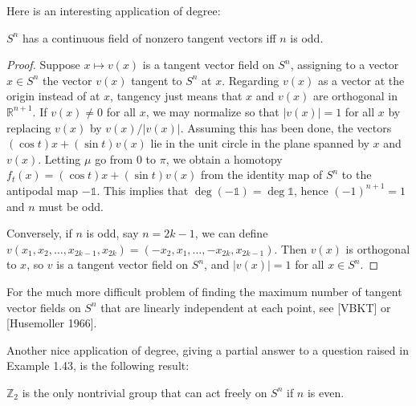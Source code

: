 Here is an interesting application of degree:

\begin{theorem}
\label{thm:tangent-vector-fields-spheres}
$S^n$ has a continuous field of nonzero tangent vectors iff $n$ is odd.
\end{theorem}
\begin{proof}
 Suppose $x \mapsto v(x)$ is a tangent vector field on $S^n$, assigning to a vector $x \in S^n$ the vector $v(x)$ tangent to $S^n$ at $x$. Regarding $v(x)$ as a vector at the origin instead of at $x$, tangency just means that $x$ and $v(x)$ are orthogonal in $\mathbb{R}^{n+1}$. If $v(x) \ne 0$ for all $x$, we may normalize so that $|v(x)| = 1$ for all $x$ by replacing $v(x)$ by $v(x)/|v(x)|$. Assuming this has been done, the vectors $(\cos t)x + (\sin t)v(x)$ lie in the unit circle in the plane spanned by $x$ and $v(x)$. Letting $\mu$ go from $0$ to $\pi$, we obtain a homotopy $f_t(x) = (\cos t)x + (\sin t)v(x)$ from the identity map of $S^n$ to the antipodal map $-\mathbb{1}$. This implies that $\deg(-\mathbb{1}) = \deg \mathbb{1}$, hence $(-1)^{n+1} = 1$ and $n$ must be odd.

Conversely, if $n$ is odd, say $n = 2k-1$, we can define $v(x_1, x_2, \ldots, x_{2k-1}, x_{2k}) = (-x_2, x_1, \ldots, -x_{2k}, x_{2k-1})$. Then $v(x)$ is orthogonal to $x$, so $v$ is a tangent vector field on $S^n$, and $|v(x)| = 1$ for all $x \in S^n$.
\end{proof}
For the much more difficult problem of finding the maximum number of tangent vector fields on $S^n$ that are linearly independent at each point, see [VBKT] or [Husemoller 1966].

Another nice application of degree, giving a partial answer to a question raised in Example 1.43, is the following result:

\begin{proposition}
\label{prop:z2-acts-freely-even-spheres}
$\mathbb{Z}_2$ is the only nontrivial group that can act freely on $S^n$ if $n$ is even.
\end{proposition}

